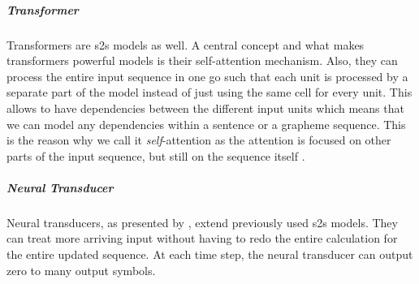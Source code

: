 \subparagraph{Transformer}
Transformers are \ac{s2s} models as well. A central concept and what makes transformers powerful models is their self-attention mechanism. Also, they can process the entire input sequence in one go such that each unit is processed by a separate part of the model instead of just using the same cell for every unit. This allows to have dependencies between the different input units which means that we can model any dependencies within a sentence or a grapheme sequence. This is the reason why we call it \textit{self}-attention as the attention is focused on other parts of the input sequence, but still on the sequence itself \citep{Alammar.03.01.2022}.

\subparagraph{Neural Transducer}
Neural transducers, as presented by \citet{jaitly2016neural}, extend previously used \ac{s2s} models. They can treat more arriving input without having to redo the entire calculation for the entire updated sequence. At each time step, the neural transducer can output zero to many output symbols. 



